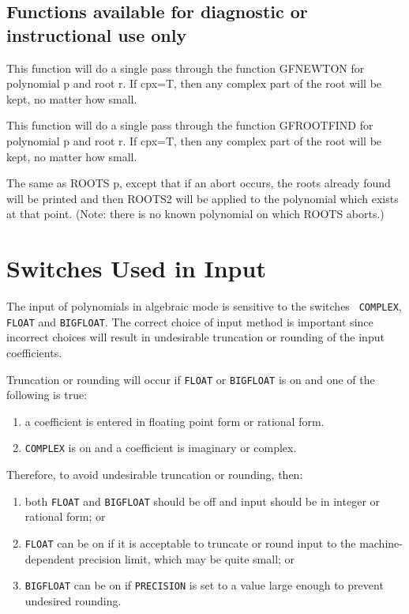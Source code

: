 \subsection{Functions available for diagnostic or instructional use only}

\begin{description}
\item[GFNEWT(p,r,cpx);] This function will do a single pass through the
function GFNEWTON for polynomial p and root r.  If cpx=T, then any
complex part of the root will be kept, no matter how small.

\item[GFROOT(p,r,cpx);] This function will do a single pass through the
function GFROOTFIND for polynomial p and root r.  If cpx=T, then any
complex part of the root will be kept, no matter how small.

\item[ROOTS2 p;] The same as ROOTS p, except that if an abort occurs, the
roots already found will be printed and then ROOTS2 will be applied to
the polynomial which exists at that point.  (Note:  there is no
known polynomial on which ROOTS aborts.)
\end{description}

\section{Switches Used in Input}

The input of polynomials in algebraic mode is sensitive to the switches {\tt
COMPLEX}, {\tt FLOAT} and {\tt BIGFLOAT}.  The correct choice of input method
is important since incorrect choices will result in undesirable truncation or
rounding of the input coefficients.

Truncation or rounding will occur if {\tt FLOAT} or {\tt BIGFLOAT} is on and
one of the following is true:

\begin{enumerate}
\item a coefficient is entered in floating point form or rational form.
\item {\tt COMPLEX} is on and a coefficient is imaginary or complex.
\end{enumerate}

Therefore, to avoid undesirable truncation or rounding, then:

\begin{enumerate}
\item both {\tt FLOAT} and {\tt BIGFLOAT} should be off and input should be
in integer or rational form; or
\item {\tt FLOAT} can be on if it is acceptable to truncate or round input to
the machine-dependent precision limit, which may be quite small; or
\item {\tt BIGFLOAT} can be on if {\tt PRECISION} is set to a value large
enough to prevent undesired rounding. \end{enumerate}


